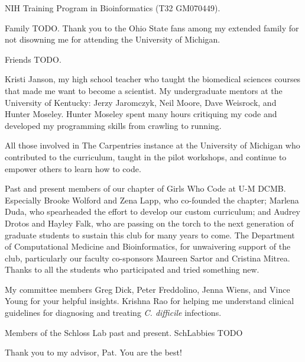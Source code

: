 NIH Training Program in Bioinformatics (T32 GM070449).

Family TODO. 
Thank you to the Ohio State fans among my extended family for not disowning me
for attending the University of Michigan.

Friends TODO. 

Kristi Janson, my high school teacher who taught the biomedical sciences
courses that made me want to become a scientist.
My undergraduate mentors at the University of Kentucky:
Jerzy Jaromczyk, Neil Moore, Dave Weisrock, and Hunter Moseley.
Hunter Moseley spent many hours critiquing my code and developed my
programming skills from crawling to running.

All those involved in The Carpentries instance at the University of Michigan who
contributed to the curriculum, taught in the pilot workshops, and continue to
empower others to learn how to code.

Past and present members of our chapter of Girls Who Code at U-M DCMB.
Especially Brooke Wolford and Zena Lapp, who co-founded the chapter;
Marlena Duda, who spearheaded the effort to develop our custom curriculum; and
Audrey Drotos and Hayley Falk, who are passing on the torch to the next
generation of graduate students to sustain this club for many years to come.
The Department of Computational Medicine and Bioinformatics, for unwaivering
support of the club, 
particularly our faculty co-sponsors Maureen Sartor and Cristina Mitrea.
Thanks to all the students who participated and tried something new.

My committee members Greg Dick, Peter Freddolino, Jenna Wiens, and Vince Young
for your helpful insights.
Krishna Rao for helping me understand clinical guidelines for diagnosing
and treating \textit{C. difficile} infections.

Members of the Schloss Lab past and present. SchLabbies TODO

Thank you to my advisor, Pat. You are the best!
